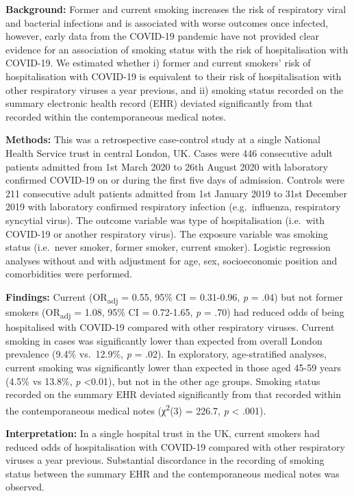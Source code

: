 \documentclass[
]{article}
\begin{document}
\textbf{Background:} Former and current smoking increases the risk of
respiratory viral and bacterial infections and is associated with worse
outcomes once infected, however, early data from the COVID-19 pandemic
have not provided clear evidence for an association of smoking status
with the risk of hospitalisation with COVID-19. We estimated whether i)
former and current smokers' risk of hospitalisation with COVID-19 is
equivalent to their risk of hospitalisation with other respiratory
viruses a year previous, and ii) smoking status recorded on the summary
electronic health record (EHR) deviated significantly from that recorded
within the contemporaneous medical notes.

\textbf{Methods:} This was a retrospective case-control study at a
single National Health Service trust in central London, UK. Cases were
446 consecutive adult patients admitted from 1st March 2020 to 26th
August 2020 with laboratory confirmed COVID-19 on or during the first
five days of admission. Controls were 211 consecutive adult patients
admitted from 1st January 2019 to 31st December 2019 with laboratory
confirmed respiratory infection (e.g.~influenza, respiratory syncytial
virus). The outcome variable was type of hospitalisation (i.e.~with
COVID-19 or another respiratory virus). The exposure variable was
smoking status (i.e.~never smoker, former smoker, current smoker).
Logistic regression analyses without and with adjustment for age, sex,
socioeconomic position and comorbidities were performed.

\textbf{Findings:} Current (OR\textsubscript{adj} = 0.55, 95\% CI =
0.31-0.96, \emph{p} = .04) but not former smokers (OR\textsubscript{adj}
= 1.08, 95\% CI = 0.72-1.65, \emph{p} = .70) had reduced odds of being
hospitalised with COVID-19 compared with other respiratory viruses.
Current smoking in cases was significantly lower than expected from
overall London prevalence (9.4\% vs.~12.9\%, \emph{p} = .02). In
exploratory, age-stratified analyses, current smoking was significantly
lower than expected in those aged 45-59 years (4.5\% vs 13.8\%, \emph{p}
\textless0.01), but not in the other age groups. Smoking status recorded
on the summary EHR deviated significantly from that recorded within the
contemporaneous medical notes (χ\textsuperscript{2}(3) = 226.7, \emph{p}
\textless{} .001).

\textbf{Interpretation:} In a single hospital trust in the UK, current
smokers had reduced odds of hospitalisation with COVID-19 compared with
other respiratory viruses a year previous. Substantial discordance in
the recording of smoking status between the summary EHR and the
contemporaneous medical notes was observed.
\end{document}
